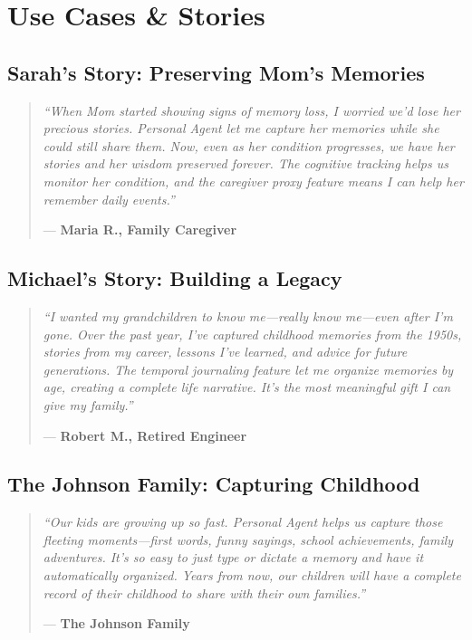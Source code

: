 \documentclass[11pt,letterpaper]{article}
\begin{document}
\newpage
\section{Use Cases \& Stories}

\subsection{Sarah's Story: Preserving Mom's Memories}

\begin{quote}
\textit{``When Mom started showing signs of memory loss, I worried we'd lose her precious stories. Personal Agent let me capture her memories while she could still share them. Now, even as her condition progresses, we have her stories and her wisdom preserved forever. The cognitive tracking helps us monitor her condition, and the caregiver proxy feature means I can help her remember daily events.''}

--- \textbf{Maria R., Family Caregiver}
\end{quote}

\subsection{Michael's Story: Building a Legacy}

\begin{quote}
\textit{``I wanted my grandchildren to know me---really know me---even after I'm gone. Over the past year, I've captured childhood memories from the 1950s, stories from my career, lessons I've learned, and advice for future generations. The temporal journaling feature let me organize memories by age, creating a complete life narrative. It's the most meaningful gift I can give my family.''}

--- \textbf{Robert M., Retired Engineer}
\end{quote}

\subsection{The Johnson Family: Capturing Childhood}

\begin{quote}
\textit{``Our kids are growing up so fast. Personal Agent helps us capture those fleeting moments---first words, funny sayings, school achievements, family adventures. It's so easy to just type or dictate a memory and have it automatically organized. Years from now, our children will have a complete record of their childhood to share with their own families.''}

--- \textbf{The Johnson Family}
\end{quote}
\end{document}
